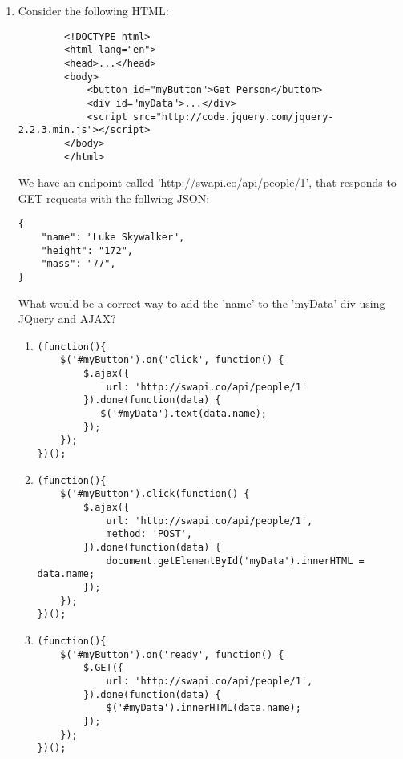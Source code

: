 \begin{enumerate}
    \item Consider the following HTML:
    \begin{verbatim}
        <!DOCTYPE html>
        <html lang="en">
        <head>...</head>
        <body>
            <button id="myButton">Get Person</button>
            <div id="myData">...</div>
            <script src="http://code.jquery.com/jquery-2.2.3.min.js"></script>
        </body>
        </html>
    \end{verbatim}
    We have an endpoint called 'http://swapi.co/api/people/1', that responds to GET requests with the follwing JSON:
    \begin{verbatim}
{
    "name": "Luke Skywalker",
    "height": "172",
    "mass": "77",
}
    \end{verbatim}
    What would be a correct way to add the 'name' to the 'myData' div using JQuery and AJAX?
        \begin{enumerate}
            \item 
            \begin{verbatim}
(function(){
    $('#myButton').on('click', function() {
        $.ajax({
            url: 'http://swapi.co/api/people/1'
        }).done(function(data) {
           $('#myData').text(data.name);
        });
    });
})();
            \end{verbatim}
            \item 
            \begin{verbatim}
(function(){
    $('#myButton').click(function() {
        $.ajax({
            url: 'http://swapi.co/api/people/1',
            method: 'POST',
        }).done(function(data) {
            document.getElementById('myData').innerHTML = data.name;
        });
    });
})();
            \end{verbatim}
            \item 
            \begin{verbatim}
(function(){
    $('#myButton').on('ready', function() {
        $.GET({
            url: 'http://swapi.co/api/people/1',
        }).done(function(data) {
            $('#myData').innerHTML(data.name);
        });
    });
})();
            \end{verbatim}
        \end{enumerate}
    
    
\end{enumerate}

